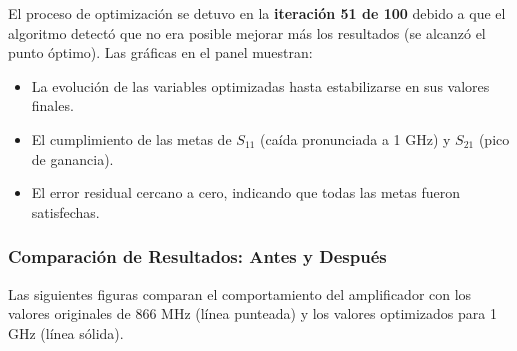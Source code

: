 El proceso de optimización se detuvo en la \textbf{iteración 51 de 100} debido a que el algoritmo detectó que no era posible mejorar más los resultados (se alcanzó el punto óptimo). Las gráficas en el panel muestran:

\begin{itemize}
    \item La evolución de las variables optimizadas hasta estabilizarse en sus valores finales.
    \item El cumplimiento de las metas de $S_{11}$ (caída pronunciada a 1 GHz) y $S_{21}$ (pico de ganancia).
    \item El error residual cercano a cero, indicando que todas las metas fueron satisfechas.
\end{itemize}

\subsubsection{Comparación de Resultados: Antes y Después}

Las siguientes figuras comparan el comportamiento del amplificador con los valores originales de 866 MHz (línea punteada) y los valores optimizados para 1 GHz (línea sólida).

